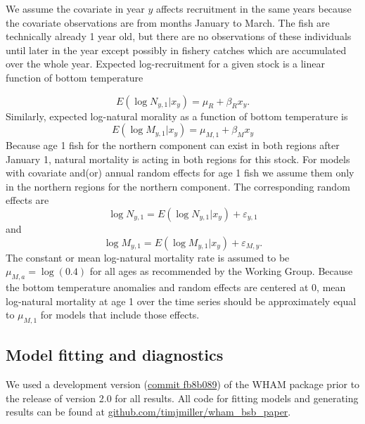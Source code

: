 \documentclass[
]{article}
\begin{document}
We assume the covariate in year \(y\) affects recruitment in the same
years because the covariate observations are from months January to
March. The fish are technically already 1 year old, but there are no
observations of these individuals until later in the year except
possibly in fishery catches which are accumulated over the whole year.
Expected log-recruitment for a given stock is a linear function of
bottom temperature

\begin{equation}\label{eq:expected-recruitment}
E\left(\log N_{y,1}|x_y\right) = \mu_{R} + \beta_{R} x_y.
\end{equation} Similarly, expected log-natural morality as a function of
bottom temperature is \begin{equation}\label{eq:expected-M1}
E\left(\log M_{y,1}|x_y\right) = \mu_{M,1} + \beta_{M} x_y
\end{equation} Because age 1 fish for the northern component can exist
in both regions after January 1, natural mortality is acting in both
regions for this stock. For models with covariate and(or) annual random
effects for age 1 fish we assume them only in the northern regions for
the northern component. The corresponding random effects are
\begin{equation}\label{eq:Rec-re}
\log N_{y,1} = E\left(\log N_{y,1}|x_y\right) + \varepsilon_{y,1}
\end{equation} and \begin{equation}\label{eq:M-re}
\log M_{y,1} = E\left(\log M_{y,1}|x_y\right) + \varepsilon_{M,y}.
\end{equation} The constant or mean log-natural mortality rate is
assumed to be \(\mu_{M,a} = \log(0.4)\) for all ages as recommended by
the Working Group. Because the bottom temperature anomalies and random
effects are centered at 0, mean log-natural mortality at age 1 over the
time series should be approximately equal to \(\mu_{M,1}\) for models
that include those effects.

\hypertarget{model-fitting-and-diagnostics}{%
\subsection*{Model fitting and
diagnostics}\label{model-fitting-and-diagnostics}}

We used a development version
(\href{https://github.com/timjmiller/wham/tree/fb8b089}{commit fb8b089})
of the WHAM package prior to the release of version 2.0 for all results.
All code for fitting models and generating results can be found at
\href{https://github.com/timjmiller/wham_bsb_paper}{github.com/timjmiller/wham\_bsb\_paper}.
\end{document}
